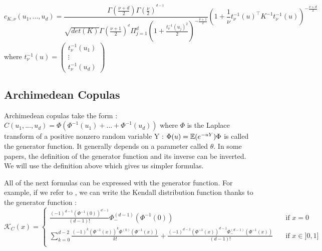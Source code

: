 \documentclass{article}
\begin{document}
	\begin{equation*}	 
	 c_{K,\nu} (u_{1},...,u_{d}) = \frac{\Gamma (\frac{\nu +d}{2}) \Gamma (\frac{\nu}{2})^{^{d-1}}}{\sqrt{det(K)}\Gamma (\frac{\nu +1}{2})^{^{d}}\Pi_{j=1}^d (1+\frac{t_\nu^{-1}(u_{j})^2}{2})^{-\frac{\nu+1}{2}}}\left(1+\frac{1}{\nu}t_\nu^{-1}(u)^\top K^{-1} t_\nu^{-1}(u) \right)^{-\frac{\nu +d}{2}}
	\end{equation*}
	\newline
	 where \begin{math} t_\nu^{-1}(u) =  \begin{pmatrix}
   t_\nu^{-1}(u_{1}) \\
  \vdots   \\
   t_\nu^{-1}(u_{d})  
 \end{pmatrix}\end{math}

	 

\subsection{Archimedean Copulas}
   Archimedean copulas take the form :
   \newline
   \newline
   \begin{math}
   C(u_{1},...,u_{d})= \Phi(\Phi^{-1}(u_{1})+...+\Phi^{-1}(u_{d}))
   \end{math}
   \newline
   \newline
   where \begin{math} \Phi \end{math} is the Laplace transform of a positive nonzero random variable Y :
	\begin{math} \Phi (u)=\mathbb{E}(e^{-uY})
	\newline
	\newline
	\Phi \end{math} is called the generator function.
	\newline
	It generally depends on a parameter called \begin{math} \theta \end{math}.
	\newline
	In some papers, the definition of the generator function and its inverse can be inverted. We will use the definition above which gives us simpler formulas.
	\newline
	
	
	All of the next formulas can be expressed with the generator function.\newline
	For example, if we refer to \cite{archimedeancopulas}, we can write the Kendall distribution function thanks to the generator function :
	\[
   		\mathcal{K}_C (x) =
   		\begin{cases}
        \frac{(-1)^{d-1}(\Phi^{-1}(0))^{d-1}}{(d-1)!}\Phi_-^{(d-1)}(\Phi^{-1}(0))  & \quad \text{if } x=0 \\
    \sum\limits_{k=0}^{d-2}\frac{(-1)^{k}(\Phi^{-1}(x))^{k}\Phi^{(k)}(\Phi^{-1}(x))}{k!}+\frac{(-1)^{d-1}(\Phi^{-1}(x))^{d-1}\Phi_-^{(d-1)}(\Phi^{-1}(x))}{(d-1)!} & \quad \text{if } x \in ]0,1] \\
  \end{cases}
  \]
\end{document}

